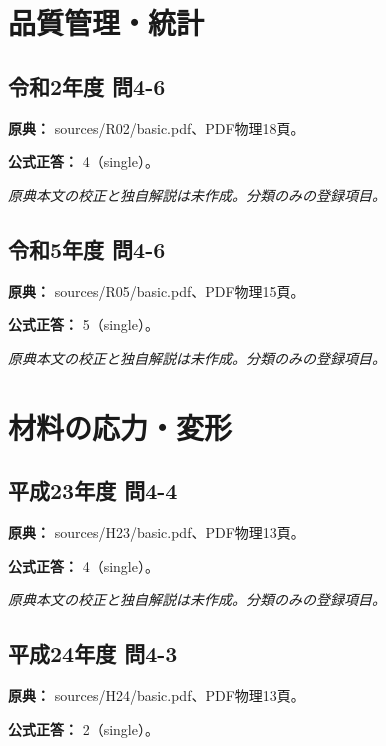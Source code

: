 \section{品質管理・統計}

\subsection{令和2年度 問4-6}
\label{q:r02-reg-basic-4-6}

\noindent\textbf{原典：} sources/R02/basic.pdf、PDF物理18頁。

\textbf{公式正答：} 4（single）。

\par\textit{原典本文の校正と独自解説は未作成。分類のみの登録項目。}

\subsection{令和5年度 問4-6}
\label{q:r05-reg-basic-4-6}

\noindent\textbf{原典：} sources/R05/basic.pdf、PDF物理15頁。

\textbf{公式正答：} 5（single）。

\par\textit{原典本文の校正と独自解説は未作成。分類のみの登録項目。}

\section{材料の応力・変形}

\subsection{平成23年度 問4-4}
\label{q:h23-reg-basic-4-4}

\noindent\textbf{原典：} sources/H23/basic.pdf、PDF物理13頁。

\textbf{公式正答：} 4（single）。

\par\textit{原典本文の校正と独自解説は未作成。分類のみの登録項目。}

\subsection{平成24年度 問4-3}
\label{q:h24-reg-basic-4-3}

\noindent\textbf{原典：} sources/H24/basic.pdf、PDF物理13頁。

\textbf{公式正答：} 2（single）。

